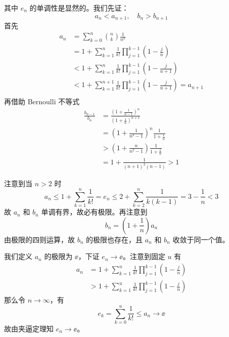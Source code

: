 其中 $e_n$ 的单调性是显然的。我们先证：
\[ a_n < a_{n+1},\quad b_n > b_{n+1} \]
首先
\[ \begin{aligned}
	a_n &= \sum_{k=0}^{n} \binom{n}{k} \frac{1}{n^k} \\
	&= 1 + \sum_{k=1}^n \frac{1}{k!} \prod_{j=1}^{k-1} \left(1 - \frac{j}{n}\right) \\
	&< 1 + \sum_{k=1}^n \frac{1}{k!} \prod_{j=1}^{k-1} \left(1 - \frac{j}{n+1}\right) \\
	&< 1 + \sum_{k=1}^{n+1} \frac{1}{k!} \prod_{j=1}^{k-1} \left(1 - \frac{j}{n+1}\right) = a_{n+1} \\
\end{aligned} \]
再借助 Bernoulli 不等式
\[ \begin{aligned}
	\frac{b_{n-1}}{b_n} &= \frac{\left(1 + \frac{1}{n-1}\right)^n}{\left(1 + \frac{1}{n}\right)^{n+1}} \\
	&= \left(1+\frac{1}{n^2 - 1}\right)^n \frac{1}{1 + \frac{1}{n}} \\
	&> \left(1+\frac{n}{n^2 - 1}\right) \frac{1}{1 + \frac{1}{n}} \\
	&= 1 + \frac{1}{(n+1)^2(n-1)} > 1
\end{aligned} \]

注意到当 $n > 2$ 时
\[ a_n \leqslant 1 + \sum_{k=1}^n \frac{1}{k!} = e_n \leqslant 2 + \sum_{k=2}^n \frac{1}{k(k-1)} = 3 - \frac{1}{n} < 3 \]
故 $a_n$ 和 $b_n$ 单调有界，故必有极限。再注意到
\[ b_n = \left(1 + \frac{1}{n}\right) a_n \]
由极限的四则运算，故 $b_n$ 的极限也存在，且 $a_n$ 和 $b_n$ 收敛于同一个值。

我们定义 $a_n$ 的极限为 $\ee$，下证 $e_n \to \ee$。注意到固定 $u$ 有
\[ \begin{aligned}
	a_n &= 1 + \sum_{k=1}^n \frac{1}{k!} \prod_{j=1}^{k-1} \left(1 - \frac{j}{n}\right) \\
	&> 1 + \sum_{k=1}^u \frac{1}{k!} \prod_{j=1}^{k-1} \left(1 - \frac{j}{n}\right)
\end{aligned} \]
那么令 $n \to \infty$，有
\[ e_k = \sum_{k=0}^u \frac{1}{k!}\leqslant a_n \to \ee \]
故由夹逼定理知 $e_n \to \ee$。

